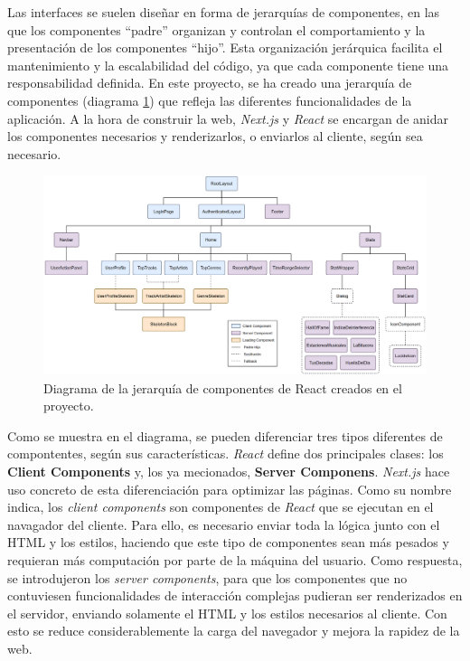 Las interfaces se suelen diseñar en forma de jerarquías de componentes, en las que los componentes ``padre'' organizan y controlan el comportamiento y la presentación de los componentes ``hijo''. Esta organización jerárquica facilita el mantenimiento y la escalabilidad del código, ya que cada componente tiene una responsabilidad definida. En este proyecto, se ha creado una jerarquía de componentes (diagrama \ref{fig:componentes_react}) que refleja las diferentes funcionalidades de la aplicación. A la hora de construir la web, \textit{Next.js} y \textit{React} se encargan de anidar los componentes necesarios y renderizarlos, o enviarlos al cliente, según sea necesario.

\begin{figure}[H]
    \centering
    \includegraphics[width=\textwidth]{figures/componentes_react.png}
    \caption{Diagrama de la jerarquía de componentes de React creados en el proyecto.}
    \label{fig:componentes_react}
\end{figure}

Como se muestra en el diagrama, se pueden diferenciar tres tipos diferentes de compontentes, según sus características. \textit{React} define dos principales clases: los \textbf{Client Components} y, los ya mecionados, \textbf{Server Componens}. \textit{Next.js} hace uso concreto de esta diferenciación para optimizar las páginas. Como su nombre indica, los \textit{client components} son componentes de \textit{React} que se ejecutan en el navagador del cliente. Para ello, es necesario enviar toda la lógica junto con el HTML y los estilos, haciendo que este tipo de componentes sean más pesados y requieran más computación por parte de la máquina del usuario. Como respuesta, se introdujeron los \textit{server components}, para que los componentes que no contuviesen funcionalidades de interacción complejas pudieran ser renderizados en el servidor, enviando solamente el HTML y los estilos necesarios al cliente. Con esto se reduce considerablemente la carga del navegador y mejora la rapidez de la web.

